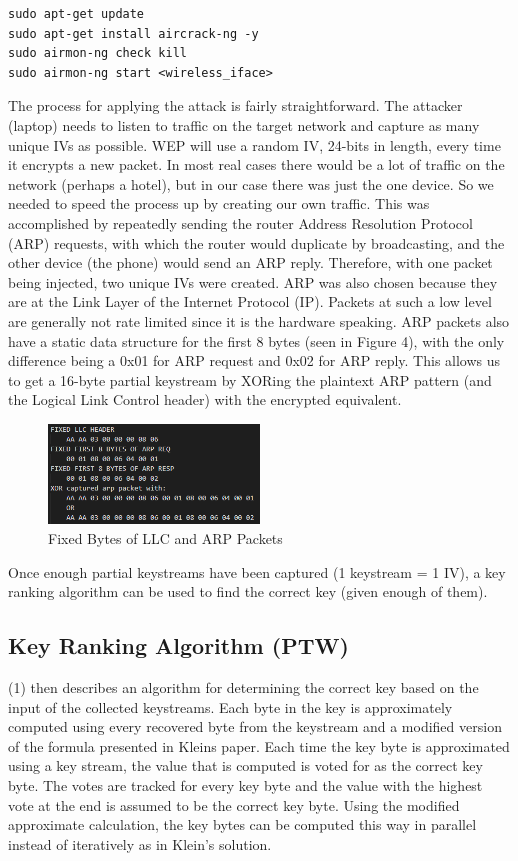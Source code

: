 \documentclass[10pt, titlepage]{article}
\begin{document}
\begin{verbatim}
sudo apt-get update
sudo apt-get install aircrack-ng -y
sudo airmon-ng check kill
sudo airmon-ng start <wireless_iface>
\end{verbatim}

The process for applying the attack is fairly straightforward. The attacker (laptop) needs to listen to traffic on the target network and capture as many unique IVs as possible. WEP will use a random IV, 24-bits in length, every time it encrypts a new packet. In most real cases there would be a lot of traffic on the network (perhaps a hotel), but in our case there was just the one device. So we needed to speed the process up by creating our own traffic. This was accomplished by repeatedly sending the router Address Resolution Protocol (ARP) requests, with which the router would duplicate by broadcasting, and the other device (the phone) would send an ARP reply. Therefore, with one packet being injected, two unique IVs were created. ARP was also chosen because they are at the Link Layer of the Internet Protocol (IP). Packets at such a low level are generally not rate limited since it is the hardware speaking. ARP packets also have a static data structure for the first 8 bytes (seen in Figure 4), with the only difference being a 0x01 for ARP request and 0x02 for ARP reply. This allows us to get a 16-byte partial keystream by XORing the plaintext ARP pattern (and the Logical Link Control header) with the encrypted equivalent.\\

\begin{figure}[H]
 	\centering
    \includegraphics[width=0.5\textwidth]{./images/fixed-bytes.png}
    \caption{Fixed Bytes of LLC and ARP Packets}
\end{figure}

Once enough partial keystreams have been captured (1 keystream = 1 IV), a key ranking algorithm can be used to find the correct key (given enough of them). 

\subsection{Key Ranking Algorithm (PTW)}
(1) then describes an algorithm for determining the correct key based on the input of the collected keystreams. Each byte in the key is approximately computed using every recovered byte from the keystream and a modified version of the formula presented in Kleins paper. Each time the key byte is approximated using a key stream, the value that is computed is voted for as the correct key byte. The votes are tracked for every key byte and the value with the highest vote at the end is assumed to be the correct key byte. Using the modified approximate calculation, the key bytes can be computed this way in parallel instead of iteratively as in Klein's solution.\\
\end{document}
